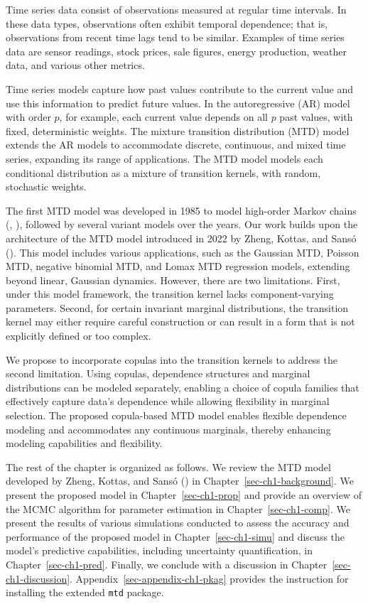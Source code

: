 \documentclass[
  letterpaper,
  double,
  12pt,
  1.0in]{beavtex}
\begin{document}
Time series data consist of observations measured at regular time
intervals. In these data types, observations often exhibit temporal
dependence; that is, observations from recent time lags tend to be
similar. Examples of time series data are sensor readings, stock prices,
sale figures, energy production, weather data, and various other
metrics.

Time series models capture how past values contribute to the current
value and use this information to predict future values. In the
autoregressive (AR) model with order \(p\), for example, each current
value depends on all \(p\) past values, with fixed, deterministic
weights. The mixture transition distribution (MTD) model extends the AR
models to accommodate discrete, continuous, and mixed time series,
expanding its range of applications. The MTD model models each
conditional distribution as a mixture of transition kernels, with
random, stochastic weights.

The first MTD model was developed in 1985 to model high-order Markov
chains (,
), followed by several variant
models over the years. Our work builds upon the architecture of the MTD
model introduced in 2022 by Zheng, Kottas, and Sansó
(). This model includes
various applications, such as the Gaussian MTD, Poisson MTD, negative
binomial MTD, and Lomax MTD regression models, extending beyond linear,
Gaussian dynamics. However, there are two limitations. First, under this
model framework, the transition kernel lacks component-varying
parameters. Second, for certain invariant marginal distributions, the
transition kernel may either require careful construction or can result
in a form that is not explicitly defined or too complex.

We propose to incorporate copulas into the transition kernels to address
the second limitation. Using copulas, dependence structures and marginal
distributions can be modeled separately, enabling a choice of copula
families that effectively capture data's dependence while allowing
flexibility in marginal selection. The proposed copula-based MTD model
enables flexible dependence modeling and accommodates any continuous
marginals, thereby enhancing modeling capabilities and flexibility.

The rest of the chapter is organized as follows. We review the MTD model
developed by Zheng, Kottas, and Sansó
() in
Chapter~\ref{sec-ch1-background}. We present the proposed model in
Chapter~\ref{sec-ch1-prop} and provide an overview of the MCMC algorithm
for parameter estimation in Chapter~\ref{sec-ch1-comp}. We present the
results of various simulations conducted to assess the accuracy and
performance of the proposed model in Chapter~\ref{sec-ch1-simu} and
discuss the model's predictive capabilities, including uncertainty
quantification, in Chapter~\ref{sec-ch1-pred}. Finally, we conclude with
a discussion in Chapter~\ref{sec-ch1-discussion}.
Appendix~\ref{sec-appendix-ch1-pkag} provides the instruction for
installing the extended \texttt{mtd} package.
\end{document}
